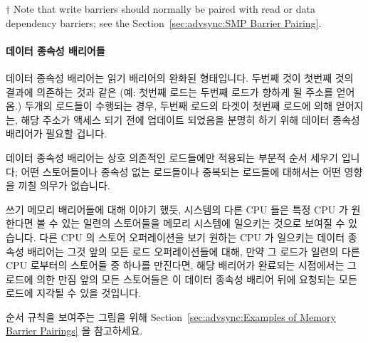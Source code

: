 \begin{enumerate}
$\dagger$ Note that write barriers should normally be paired with read
or data dependency barriers; see the
Section~\ref{sec:advsync:SMP Barrier Pairing}.
\fi

\paragraph{데이터 종속성 배리어들}

데이터 종속성 배리어는 읽기 배리어의 완화된 형태입니다.
두번째 것이 첫번째 것의 결과에 의존하는 것과 같은 (예: 첫번째 로드는 두번째
로드가 향하게 될 주소를 얻어옴.) 두개의 로드들이 수행되는 경우, 두번째 로드의
타겟이 첫번째 로드에 의해 얻어지는, 해당 주소가 액세스 되기 전에 업데이트
되었음을 분명히 하기 위해 데이터 종속성 배리어가 필요할 겁니다.

데이터 종속성 배리어는 상호 의존적인 로드들에만 적용되는 부분적 순서 세우기
입니다; 어떤 스토어들이나 종속성 없는 로드들이나 중복되는 로드들에 대해서는
어떤 영향을 끼칠 의무가 없습니다.

쓰기 메모리 배리어들에 대해 이야기 했듯, 시스템의 다른 CPU 들은 특정 CPU 가
원한다면 볼 수 있는 일련의 스토어들을 메모리 시스템에 일으키는 것으로 보여질 수
있습니다.
다른 CPU 의 스토어 오퍼레이션을 보기 원하는 CPU 가 일으키는 데이터 종속성
배리어는 그것 앞의 모든 로드 오퍼레이션들에 대해, 만약 그 로드가 일련의 다른
CPU 로부터의 스토어들 중 하나를 만진다면, 해당 배리어가 완료되는 시점에서는 그
로드에 의한 만짐 앞의 모든 스토어들은 이 데이터 종속성 배리어 뒤에 요청되는
모든 로드에 지각될 수 있을 것입니다.

순서 규칙을 보여주는 그림을 위해 Section~\ref{sec:advsync:Examples of Memory
Barrier Pairings} 을 참고하세요.


\end{enumerate}
